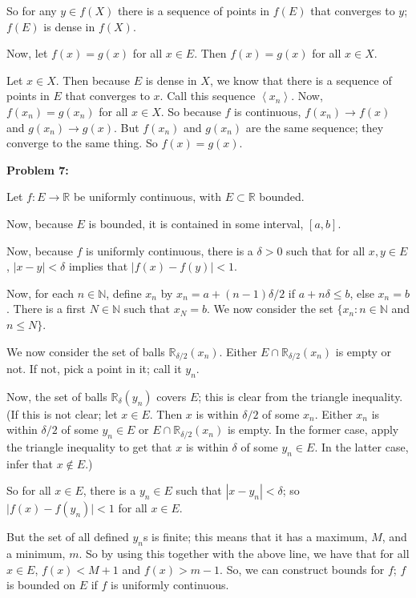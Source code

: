 \documentclass[a4paper,12pt]{article}
\newcommand{\tab}{\hspace{4mm}} %
\newcommand{\shunt}{\vspace{20mm}}
\newcommand{\absval}[1]{\lvert #1 \rvert}
\newcommand{\anbrack}[1]{\left\langle #1 \right\rangle}
\newcommand{\de}{\delta}
\newcommand{\N}{\mathbb{N}}
\newcommand{\R}{\mathbb{R}}
\begin{document}
\tab So for any $y \in f(X)$ there is a sequence of points in $f(E)$ that converges to $y$; $f(E)$ is dense in $f(X)$.

Now, let $f(x)=g(x)$ for all $x \in E$. Then $f(x)=g(x)$ for all $x \in X$.

\tab Let $x \in X$. Then because $E$ is dense in $X$, we know that there is a sequence of points in $E$ that converges to $x$. Call this sequence $\anbrack{x_n}$. Now, $f(x_n) = g(x_n)$ for all $x \in X$. So because $f$ is continuous, $f(x_n) \to f(x)$ and $g(x_n) \to g(x)$. But $f(x_n)$ and $g(x_n)$ are the same sequence; they converge to the same thing. So $f(x) = g(x)$.

\shunt

{\bf Problem 7:}

Let $f: E \to \R$ be uniformly continuous, with $E \subset \R$ bounded.

Now, because $E$ is bounded, it is contained in some interval, $[a,b]$.

Now, because $f$ is uniformly continuous, there is a $\de >0$ such that for all $x,y \in E$, $|x-y| < \de$ implies that $\absval{f(x)-f(y)} < 1$.

Now, for each $n \in \N$, define $x_n$ by $x_n = a+ (n-1)\de/2$ if $a+n\de \leq b$, else $x_n = b$. There is a first $N \in \N$ such that $x_N = b$. We now consider the set $\{x_n: n \in \N$ and $n \leq N\}$.

We now consider the set of balls $\R_{\de/2}(x_n)$. Either $E \cap \R_{\de /2}(x_n)$ is empty or not. If not, pick a point in it; call it $y_n$.

Now, the set of balls $\R_{\de}(y_n)$ covers $E$; this is clear from the triangle inequality. (If this is not clear; let $x \in E$. Then $x$ is within $\de /2$ of some $x_n$. Either $x_n$ is within $\de /2$ of some $y_n \in E$ or $E \cap \R_{\de /2}(x_n)$ is empty. In the former case, apply the triangle inequality to get that $x$ is within $\de $ of some $y_n \in E$. In the latter case, infer that $x \notin E$.)

So for all $x \in E$, there is a $y_n \in E$ such that $|x-y_n| < \de$; so $\absval{f(x)-f(y_n)} < 1$ for all $x \in E$.

But the set of all defined $y_n$s is finite; this means that it has a maximum, $M$, and a minimum, $m$. So by using this together with the above line, we have that for all $x \in E$, $f(x) < M+1$ and $f(x) > m-1$. So, we can construct bounds for $f$; $f$ is bounded on $E$ if $f$ is uniformly continuous.
\shunt
\end{document}
